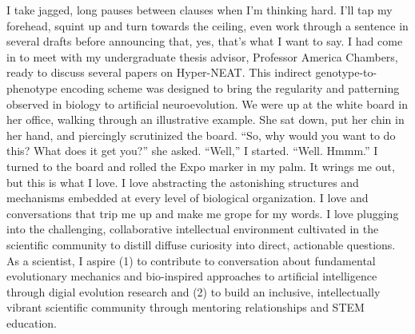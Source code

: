 I take jagged, long pauses between clauses when I'm thinking hard.
I'll tap my forehead, squint up and turn towards the ceiling, even work through a sentence in several drafts before announcing that, yes, that's what I want to say.
I had come in to meet with my undergraduate thesis advisor, Professor America Chambers, ready to discuss several papers on Hyper-NEAT.
This indirect genotype-to-phenotype encoding scheme was designed to bring the regularity and patterning observed in biology to artificial neuroevolution.
We were up at the white board in her office, walking through an illustrative example.
She sat down, put her chin in her hand, and piercingly scrutinized the board.
``So, why would you want to do this? What does it get you?'' she asked.
``Well,'' I started.
``Well.
Hmmm.''
I turned to the board and rolled the Expo marker in my palm.
It wrings me out, but this is what I love.
I love abstracting the astonishing structures and mechanisms embedded at every level of biological organization.
I love and conversations that  trip me up and make me grope for my words.
I love plugging into the challenging, collaborative intellectual environment cultivated in the scientific community to distill diffuse curiosity into direct, actionable questions.
As a scientist, I aspire
(1) to contribute to conversation about fundamental evolutionary mechanics and bio-inspired approaches to artificial intelligence through digial evolution research
and (2) to build an inclusive, intellectually vibrant scientific community through mentoring relationships and STEM education.
